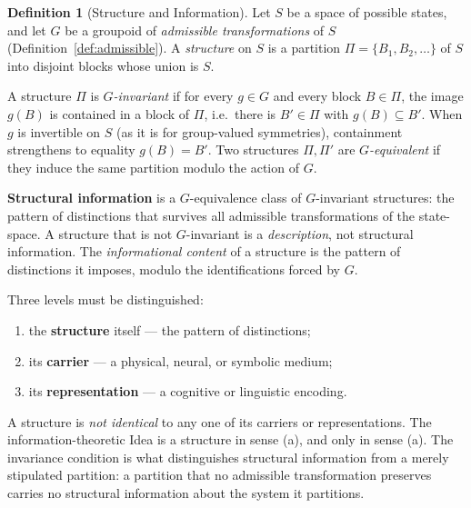 \documentclass[11pt,a4paper]{article}
\theoremstyle{definition}
\newtheorem{definition}{Definition}[section]
\theoremstyle{remark}
\begin{document}
\begin{definition}[Structure and Information]\label{def:structure}
Let $S$ be a space of possible states, and let $G$ be a groupoid of
\emph{admissible transformations} of $S$
(Definition~\ref{def:admissible}). A \emph{structure} on $S$ is a
partition $\Pi = \{B_1, B_2, \dots\}$ of $S$ into disjoint blocks
whose union is $S$.

A structure $\Pi$ is \emph{$G$-invariant} if for every $g \in G$ and
every block $B \in \Pi$, the image $g(B)$ is contained in a block of
$\Pi$, i.e.\ there is $B' \in \Pi$ with $g(B) \subseteq B'$. When $g$
is invertible on $S$ (as it is for group-valued symmetries), containment
strengthens to equality $g(B) = B'$. Two structures $\Pi, \Pi'$ are
\emph{$G$-equivalent} if they induce the same partition modulo the
action of $G$.

\textbf{Structural information} is a $G$-equivalence class of
$G$-invariant structures: the pattern of distinctions that survives all
admissible transformations of the state-space. A structure that is not
$G$-invariant is a \emph{description}, not structural information. The
\emph{informational content} of a structure is the pattern of
distinctions it imposes, modulo the identifications forced by $G$.

Three levels must be distinguished:
\begin{enumerate}[label=(\alph*),nosep]
  \item the \textbf{structure} itself --- the pattern of distinctions;
  \item its \textbf{carrier} --- a physical, neural, or symbolic medium;
  \item its \textbf{representation} --- a cognitive or linguistic
        encoding.
\end{enumerate}
A structure is \emph{not identical} to any one of its carriers or
representations. The information-theoretic Idea is a structure in sense
(a), and only in sense (a). The invariance condition is what
distinguishes structural information from a merely stipulated
partition: a partition that no admissible transformation preserves
carries no structural information about the system it partitions.
\end{definition}
\end{document}
